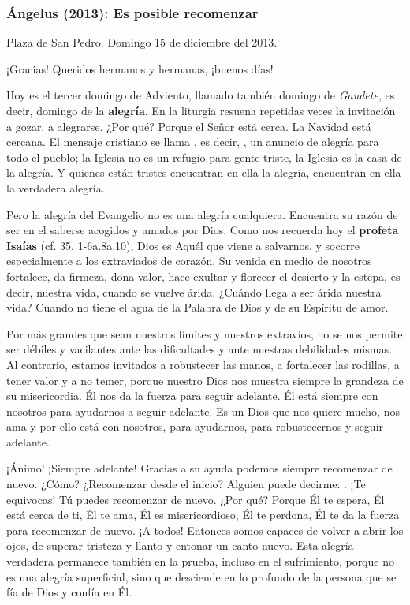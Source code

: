 \subsubsection{Ángelus (2013): Es posible recomenzar}

Plaza de San Pedro. Domingo 15 de diciembre del 2013.

¡Gracias! Queridos hermanos y hermanas, ¡buenos días!

Hoy es el tercer domingo de Adviento, llamado también domingo de \emph{Gaudete}, es decir, domingo de la \textbf{alegría}. En la liturgia resuena repetidas veces la invitación a gozar, a alegrarse. ¿Por qué? Porque el Señor está cerca. La Navidad está cercana. El mensaje cristiano se llama , es decir, , un anuncio de alegría para todo el pueblo; la Iglesia no es un refugio para gente triste, la Iglesia es la casa de la alegría. Y quienes están tristes encuentran en ella la alegría, encuentran en ella la verdadera alegría.

Pero la alegría del Evangelio no es una alegría cualquiera. Encuentra su razón de ser en el saberse acogidos y amados por Dios. Como nos recuerda hoy el \textbf{profeta Isaías} (cf. 35, 1-6a.8a.10), Dios es Aquél que viene a salvarnos, y socorre especialmente a los extraviados de corazón. Su venida en medio de nosotros fortalece, da firmeza, dona valor, hace exultar y florecer el desierto y la estepa, es decir, nuestra vida, cuando se vuelve árida. ¿Cuándo llega a ser árida nuestra vida? Cuando no tiene el agua de la Palabra de Dios y de su Espíritu de amor.

Por más grandes que sean nuestros límites y nuestros extravíos, no se nos permite ser débiles y vacilantes ante las dificultades y ante nuestras debilidades mismas. Al contrario, estamos invitados a robustecer las manos, a fortalecer las rodillas, a tener valor y a no temer, porque nuestro Dios nos muestra siempre la grandeza de su misericordia. Él nos da la fuerza para seguir adelante. Él está siempre con nosotros para ayudarnos a seguir adelante. Es un Dios que nos quiere mucho, nos ama y por ello está con nosotros, para ayudarnos, para robustecernos y seguir adelante.

¡Ánimo! ¡Siempre adelante! Gracias a su ayuda podemos siempre recomenzar de nuevo. ¿Cómo? ¿Recomenzar desde el inicio? Alguien puede decirme: . ¡Te equivocas! Tú puedes recomenzar de nuevo. ¿Por qué? Porque Él te espera, Él está cerca de ti, Él te ama, Él es misericordioso, Él te perdona, Él te da la fuerza para recomenzar de nuevo. ¡A todos! Entonces somos capaces de volver a abrir los ojos, de superar tristeza y llanto y entonar un canto nuevo. Esta alegría verdadera permanece también en la prueba, incluso en el sufrimiento, porque no es una alegría superficial, sino que desciende en lo profundo de la persona que se fía de Dios y confía en Él.

